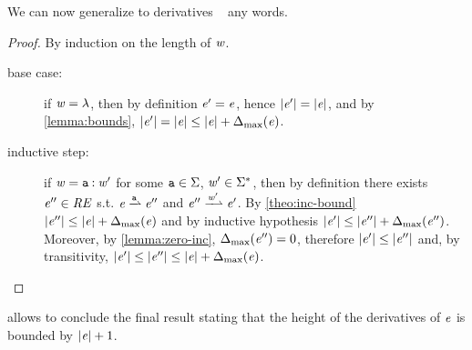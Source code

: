 We can now generalize  to derivatives \wrt~ any words.
\begin{proof}
 By induction on the length of $\mathit {w}$.
 \begin{description}
  \item[base case:] if $\mathit {w}=\lambda$, then by definition $\mathit {e}'=\mathit {e}$, hence
   ${\mid}{\mathit {e}'}{\mid}={\mid}{\mathit {e}}{\mid}$, and by \cref{lemma:bounds}, ${\mid}{\mathit {e}'}{\mid}={\mid}{\mathit {e}}{\mid}\leq{\mid}{\ensuremath{\mathit {e}}}{\mid}+{\Delta_{\max}}({\mathit {e}})$.

  \item[inductive step:]
   if $\mathit {w}=\mathtt {a}\mathbin{:}\mathit {w}'$ for some $\mathtt {a}\in\Sigma$, $\mathit {w}'\in\Sigma^*$, then by definition there exists $\mathit {e}''\in\mathit {RE}$ s.t. $\re\parDer{\sym}\re''$ and $\re''\parDer{\word'}\re'$. By \cref{theo:inc-bound} ${\mid}{\mathit {e}''}{\mid}\leq{\mid}{\ensuremath{\mathit {e}}}{\mid}+{\Delta_{\max}}({\mathit {e}})$ and by inductive hypothesis ${\mid}{\mathit {e}'}{\mid}\leq{\mid}{\ensuremath{\mathit {e}}''}{\mid}+{\Delta_{\max}}({\mathit {e}''})$. Moreover, by \cref{lemma:zero-inc},
   ${\Delta_{\max}}({\mathit {e}''})=0$, therefore ${\mid}{\mathit {e}'}{\mid}\leq{\mid}{\ensuremath{\mathit {e}}''}{\mid}$ and, by transitivity,
   ${\mid}{\mathit {e}'}{\mid}\leq{\mid}{\ensuremath{\mathit {e}}''}{\mid}\leq{\mid}{\ensuremath{\mathit {e}}}{\mid}+{\Delta_{\max}}({\mathit {e}})$.
 \end{description}
\end{proof}

 allows to conclude the final result stating that the height of the derivatives of $\mathit {e}$ is bounded by ${\mid}{\mathit {e}}{\mid}+1$.
